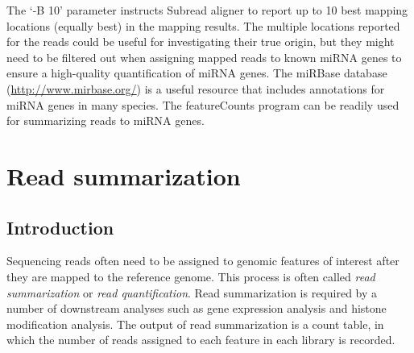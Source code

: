 \documentclass[12pt]{report}
\newcommand{\Subread}{\textsf{Subread}}
\newcommand{\featureCounts}{\textsf{featureCounts}}
\begin{document}
The `-B 10' parameter instructs {\Subread} aligner to report up to 10 best mapping locations (equally best) in the mapping results.
The multiple locations reported for the reads could be useful for investigating their true origin, but they might need to be filtered out when assigning mapped reads to known miRNA genes to ensure a high-quality quantification of miRNA genes.
The miRBase database (\url{http://www.mirbase.org/}) is a useful resource that includes annotations for miRNA genes in many species.
The {\featureCounts} program can be readily used for summarizing reads to miRNA genes.



\chapter{Read summarization}

\section{Introduction}

Sequencing reads often need to be assigned to genomic features of interest after they are mapped to the reference genome.
This process is often called \emph{read summarization} or \emph{read quantification}.
Read summarization is required by a number of downstream analyses such as gene expression analysis and histone modification analysis.
The output of read summarization is a count table, in which the number of reads assigned to each feature in each library is recorded.
\end{document}
